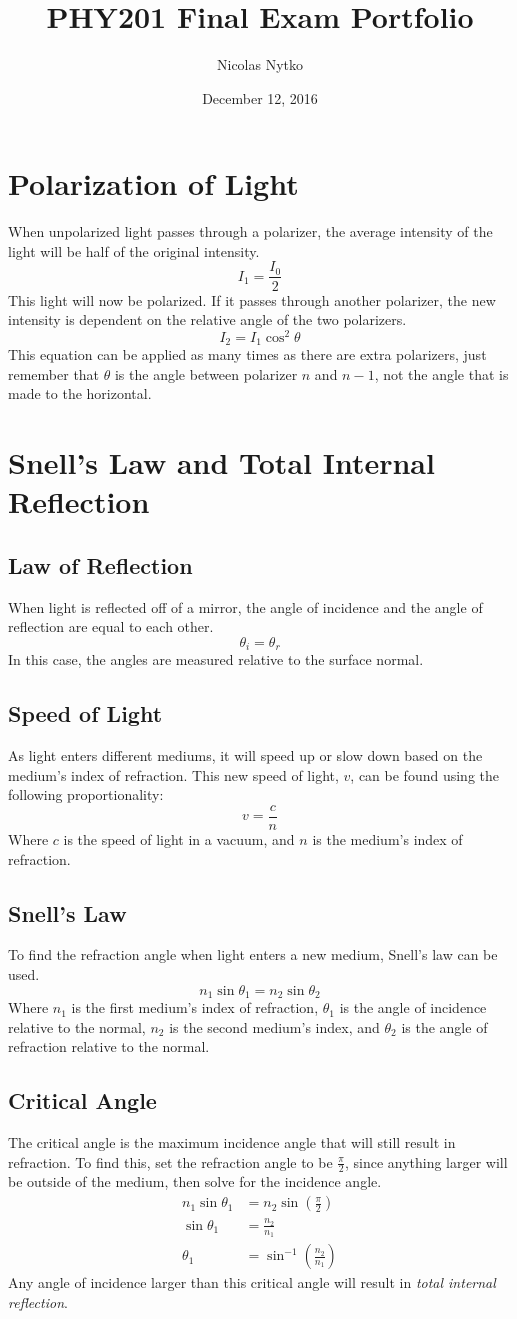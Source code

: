 \documentclass{article}
\title{PHY201 Final Exam Portfolio}
\author{Nicolas Nytko}
\date{December 12, 2016}
\begin{document}
\maketitle
\newpage
\section{Polarization of Light}
When unpolarized light passes through a polarizer, the average intensity of the light will be half of the original intensity.
\[ I_1 = \frac{I_0}{2} \]
This light will now be polarized.  If it passes through another polarizer, the new intensity is dependent on the relative angle of the two polarizers.
\[ I_2 = I_1 \cos^2 \theta \]
This equation can be applied as many times as there are extra polarizers, just remember that $\theta$ is the angle between polarizer $n$ and $n-1$, not the angle that is made to the horizontal.
\section{Snell's Law and Total Internal Reflection}
\subsection{Law of Reflection}
When light is reflected off of a mirror, the angle of incidence and the angle of reflection are equal to each other.
\[ \theta_i = \theta_r \]
In this case, the angles are measured relative to the surface normal.
\subsection{Speed of Light}
As light enters different mediums, it will speed up or slow down based on the medium's index of refraction.  This new speed of light, $v$, can be found using the following proportionality:
\[v=\frac{c}{n}\]
Where $c$ is the speed of light in a vacuum, and $n$ is the medium's index of refraction.
\subsection{Snell's Law}
To find the refraction angle when light enters a new medium, Snell's law can be used.
\[n_1\sin\theta_1=n_2\sin\theta_2\]
Where $n_1$ is the first medium's index of refraction, $\theta_1$ is the angle of incidence relative to the normal, $n_2$ is the second medium's index, and $\theta_2$ is the angle of refraction relative to the normal.
\subsection{Critical Angle}
The critical angle is the maximum incidence angle that will still result in refraction.  To find this, set the refraction angle to be $\frac{\pi}{2}$, since anything larger will be outside of the medium, then solve for the incidence angle.
\begin{align*}
n_1\sin\theta_1&=n_2\sin\left(\frac{\pi}{2}\right) \\
\sin\theta_1&=\frac{n_2}{n_1} \\
\theta_1&=\sin^{-1}\left(\frac{n_2}{n_1}\right)
\end{align*}
Any angle of incidence larger than this critical angle will result in \textit{total internal reflection}.
\end{document}
